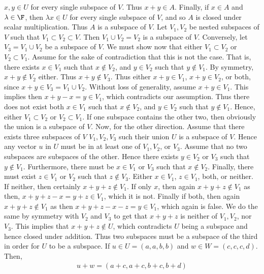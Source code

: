 \documentclass{book}
\begin{document}
\begin{enumerate}[label=\arabic*)]
      $x, y \in U$ for every single subspace of $V$. Thus $x + y \in A$. Finally, if $x \in A$ and $\lambda \in \F$, then $\lambda x \in U$ for every single subspace of $V$,
      and so $A$ is closed under scalar multiplication. Thus $A$ is a subspace of $V$.
    \ii
      Let $V_1, V_2$ be nested subspaces of $V$ such that $V_1 \subset V_2 \subset V$. Then $V_1 \cup V_2 = V_2$ is a subspace of $V$. Conversely, let $V_3 = V_1 \cup
      V_2$ be a subspace of $V$. We must show now that either $V_1 \subset V_2$ or $V_2 \subset V_1$. Assume for the sake of contradiction that this is not the case. That is,
      there exists $x \in V_1$ such that $x \not\in V_2$, and $y \in V_2$ such that $y \not\in V_1$. By symmetry, $x + y \not\in V_2$ either. Thus $x + y \not\in V_3$. Thus
      either $x + y \in V_1$, $x + y \in V_2$, or both, since $x + y \in V_3 = V_1 \cup V_2$. Without loss of generality, assume $x + y \in V_1$. This implies then $x + y - x
      = y \in V_1$, which contradicts our assumption. Thus there does not exist both $x \in V_1$ such that $x \not\in V_2$, and $y \in V_2$ such that $y \not\in V_1$. Hence,
      either $V_1 \subset V_2$ or $V_2 \subset V_1$.
    \ii
      If one subspace contains the other two, then obviously the union is a subspace of $V$. Now, for the other direction. Assume that there exists three subspaces of $V$
      $V_1, V_2, V_3$ such their union $U$ is a subspace of $V$. Hence any vector $u$ in $U$ must be in at least one of $V_1, V_2$, or $V_3$. Assume that no two subspaces are
      subspaces of the other. Hence there exists $y \in V_2$ or $V_3$ such that $y \not\in V_1$. Furthermore, there must be $x \in V_1$ or $V_3$ such that $x \not\in V_2$.
      Finally, there must exist $z \in V_1$ or $V_2$ such that $z \not\in V_3$. Either $x \in V_1$, $z \in V_1$, both, or neither. If neither, then certainly $x + y + z
      \not\in V_1$. If only $x$, then again $x + y + z \not\in V_1$ as then, $x + y + z - x = y + z \in V_1$, which it is not. Finally if both, then again $x + y + z \not\in
      V_1$ as then $x + y + z - x - z = y \in V_1$, which again is false. We do the same by symmetry with $V_2$ and $V_3$ to get that $x + y + z$ is neither of $V_1, V_2$, nor
      $V_3$. This implies that $x + y + z \not\in U$, which contradicts $U$ being a subspace and hence closed under addition. Thus two subspaces must be a subspace of the
      third in order for $U$ to be a subspace.
    \ii 
      If $u \in U = (a, a, b, b)$ and $w \in W = (c,c,c, d)$. Then,
      \begin{align*}
        u + w = (a + c, a + c, b + c, b + d)

\end{align*}
\end{enumerate}
\end{document}
